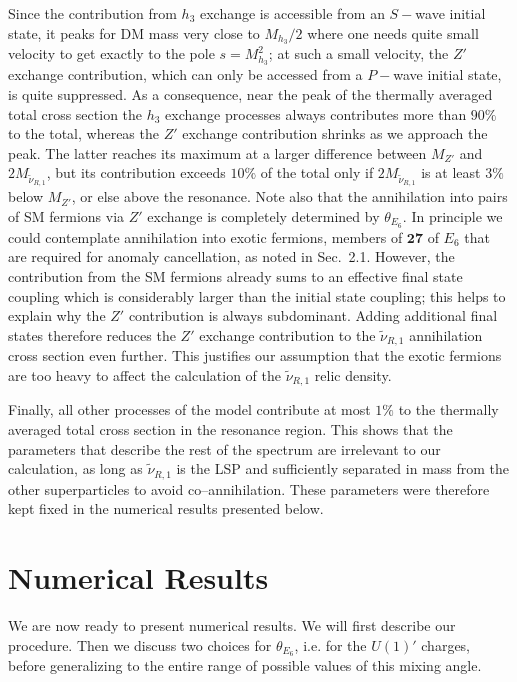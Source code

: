 \documentclass[a4paper,11pt]{article}
\begin{document}
Since the contribution from $h_3$ exchange is accessible from an
$S-$wave initial state, it peaks for DM mass very close to $M_{h_3}/2$
where one needs quite small velocity to get exactly to the pole
$s=M_{h_3}^{2}$; at such a small velocity, the $Z'$ exchange
contribution, which can only be accessed from a $P-$wave initial
state, is quite suppressed. As a consequence, near the peak of the
thermally averaged total cross section the $h_3$ exchange processes
always contributes more than $90\%$ to the total, whereas the $Z'$
exchange contribution shrinks as we approach the peak. The latter
reaches its maximum at a larger difference between $M_{Z'}$ and
$2M_{\tilde \nu_{R,1}}$, but its contribution exceeds $10\%$ of the
total only if $2M_{\tilde \nu_{R,1}}$ is at least $3\%$ below $M_{Z'}$,
or else above the resonance. Note also that the annihilation into
pairs of SM fermions via $Z'$ exchange is completely determined by
$\theta_{E_6}$. In principle we could contemplate annihilation into
exotic fermions, members of $\mathbf{27}$ of $E_6$ that are
required for anomaly cancellation, as noted in Sec.~2.1. However, the
contribution from the SM fermions already sums to an effective final
state coupling which is considerably larger than the initial state
coupling; this helps to explain why the $Z'$ contribution is always
subdominant. Adding additional final states therefore reduces the $Z'$
exchange contribution to the $\tilde \nu_{R,1}$ annihilation cross
section even further. This justifies our assumption that the exotic
fermions are too heavy to affect the calculation of the
$\tilde \nu_{R,1}$ relic density.

Finally, all other processes of the model contribute at most $1\%$ to
the thermally averaged total cross section in the resonance region.
This shows that the parameters that describe the rest of the spectrum
are irrelevant to our calculation, as long as $\tilde \nu_{R,1}$ is
the LSP and sufficiently separated in mass from the other
superparticles to avoid co--annihilation. These parameters were
therefore kept fixed in the numerical results presented below.


\section{Numerical Results}  
\label{section4}

We are now ready to present numerical results. We will first describe
our procedure. Then we discuss two choices for $\theta_{E_6}$, i.e.
for the $U(1)'$ charges, before generalizing to the entire range of
possible values of this mixing angle.
\end{document}
